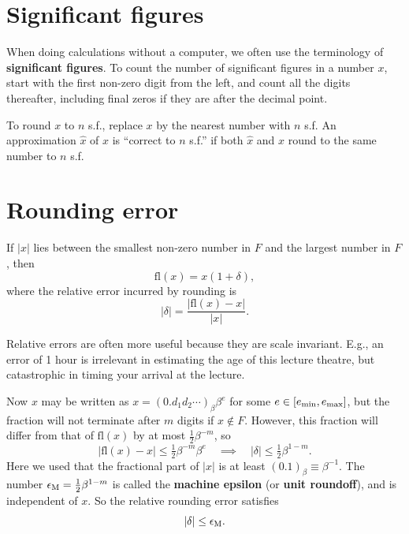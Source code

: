 \documentclass[
  letterpaper,
  DIV=11,
  numbers=noendperiod]{scrreprt}
\begin{document}
\section{Significant figures}\label{significant-figures}

When doing calculations without a computer, we often use the terminology
of \textbf{significant figures}. To count the number of significant
figures in a number \(x\), start with the first non-zero digit from the
left, and count all the digits thereafter, including final zeros if they
are after the decimal point.

To round \(x\) to \(n\) s.f., replace \(x\) by the nearest number with
\(n\) s.f. An approximation \(\hat{x}\) of \(x\) is ``correct to \(n\)
s.f.'' if both \(\hat{x}\) and \(x\) round to the same number to \(n\)
s.f.

\section{Rounding error}\label{rounding-error}

If \(|x|\) lies between the smallest non-zero number in \(F\) and the
largest number in \(F\), then \[
\mathrm{fl}(x) = x(1+\delta),
\] where the relative error incurred by rounding is \[
|\delta| = \frac{|\mathrm{fl}(x) - x|}{|x|}.
\]

\begin{tcolorbox}[enhanced jigsaw, bottomtitle=1mm, title=\textcolor{quarto-callout-note-color}{\faInfo}\hspace{0.5em}{Note}, colback=white, opacityback=0, rightrule=.15mm, bottomrule=.15mm, colbacktitle=quarto-callout-note-color!10!white, colframe=quarto-callout-note-color-frame, arc=.35mm, breakable, coltitle=black, leftrule=.75mm, left=2mm, toptitle=1mm, toprule=.15mm, titlerule=0mm, opacitybacktitle=0.6]

Relative errors are often more useful because they are scale invariant.
E.g., an error of 1 hour is irrelevant in estimating the age of this
lecture theatre, but catastrophic in timing your arrival at the lecture.

\end{tcolorbox}

Now \(x\) may be written as \(x=(0.d_1d_2\cdots)_\beta\beta^e\) for some
\(e\in[e_{\rm min},e_{\rm max}]\), but the fraction will not terminate
after \(m\) digits if \(x\notin F\). However, this fraction will differ
from that of \(\mathrm{fl}(x)\) by at most \(\tfrac12\beta^{-m}\), so \[
|\mathrm{fl}(x) - x| \leq \tfrac12\beta^{-m}\beta^e \quad \implies \quad |\delta| \leq \tfrac12\beta^{1-m}.
\] Here we used that the fractional part of \(|x|\) is at least
\((0.1)_\beta \equiv \beta^{-1}\). The number
\(\epsilon_{\rm M} = \tfrac12\beta^{1-m}\) is called the \textbf{machine
epsilon} (or \textbf{unit roundoff}), and is independent of \(x\). So
the relative rounding error satisfies \[
|\delta| \leq \epsilon_{\rm M}.
\]
\end{document}
